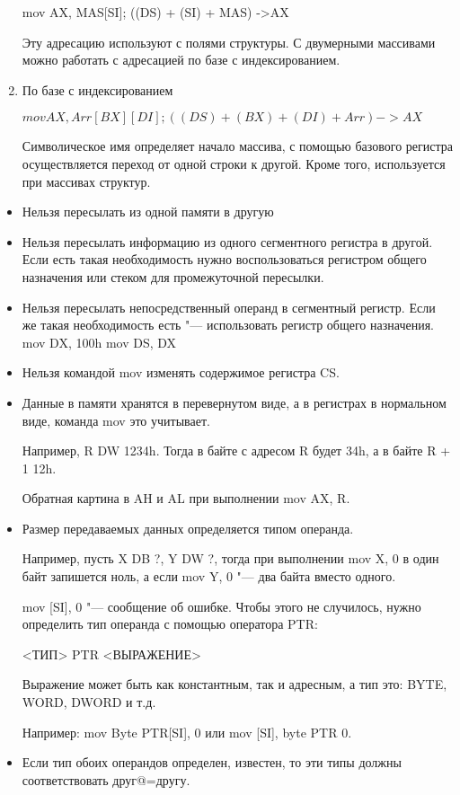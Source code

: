 \begin{enumerate}
    mov AX, MAS[SI]; ((DS) + (SI) + MAS) ->AX

    Эту адресацию используют с полями структуры. С двумерными массивами можно работать с адресацией по базе с индексированием.
    
    \item По базе с индексированием
    
    $mov AX,Arr[BX][DI]; ((DS) + (BX) + (DI) + Arr)->AX$

Символическое имя определяет начало массива, с помощью базового регистра осуществляется
переход от одной строки к другой. Кроме того, используется при массивах структур.
    
    
\end{enumerate}

\begin{itemize}
    \item Нельзя пересылать из одной памяти в другую
    \item Нельзя пересылать информацию из одного сегментного регистра в другой.
    Если есть такая необходимость нужно воспользоваться регистром общего назначения или стеком
    для промежуточной пересылки.
    \item Нельзя пересылать непосредственный операнд в сегментный регистр. Если же такая
    необходимость есть "--- использовать регистр общего назначения.
    mov DX, 100h
    mov DS, DX
    \item Нельзя командой mov изменять содержимое регистра CS.
    \item Данные в памяти хранятся в перевернутом виде, а в регистрах в нормальном
    виде, команда mov это учитывает.

    Например, R DW 1234h. Тогда в байте с адресом R будет 34h, а в байте R + 1 12h.
    
    Обратная картина в AH и AL при выполнении mov AX, R.
    \item Размер передаваемых данных определяется типом операнда.
    
    Например, пусть X DB ?, Y DW ?, тогда при выполнении mov X, 0 в один байт запишется
    ноль, а если mov Y, 0 "--- два байта вместо одного.

    mov [SI], 0 "--- сообщение об ошибке. Чтобы этого не случилось, нужно определить
    тип операнда с помощью оператора PTR:

    <ТИП> PTR <ВЫРАЖЕНИЕ>

    Выражение может быть как константным, так и адресным, а тип это: BYTE, WORD, DWORD и т.д.

    Например: mov Byte PTR[SI], 0 или mov [SI], byte PTR 0.
    \item Если тип обоих операндов определен, известен, то эти типы должны соответствовать друг@=другу.
\end{itemize}

